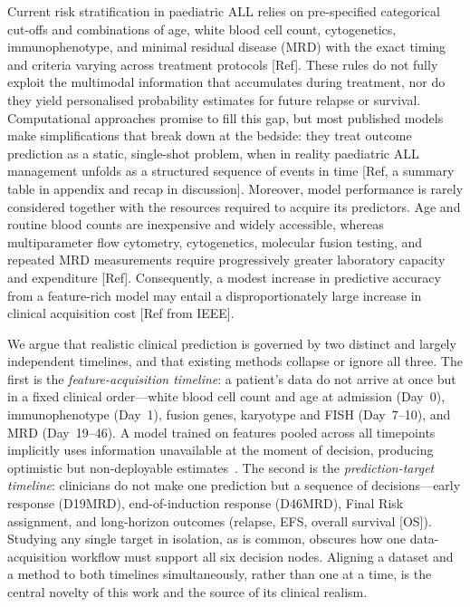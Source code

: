 \documentclass[pdflatex,sn-nature]{sn-jnl}
\begin{document}
Current risk stratification in paediatric ALL relies
on pre-specified categorical cut-offs and combinations of age, white blood cell count,
cytogenetics, immunophenotype, and minimal residual disease (MRD) with the exact timing and criteria varying across treatment
protocols [Ref].
These rules do not fully exploit the multimodal information that
accumulates during treatment, nor do they yield personalised
probability estimates for future relapse or survival.
Computational approaches promise to fill this gap, but most published
models make simplifications that break down at the bedside: they treat
outcome prediction as a static, single-shot problem, when in reality
paediatric ALL management unfolds as a structured sequence of events in
time [Ref, a summary table in appendix and recap in discussion]. Moreover, model performance is rarely considered together with
the resources required to acquire its predictors. Age and routine
blood counts are inexpensive and widely accessible, whereas
multiparameter flow cytometry, cytogenetics, molecular fusion testing,
and repeated MRD measurements require progressively greater laboratory
capacity and expenditure [Ref].
Consequently, a modest increase in predictive accuracy from a
feature-rich model may entail a disproportionately large increase in
clinical acquisition cost [Ref from IEEE].

We argue that realistic clinical prediction is governed by two
distinct and largely independent timelines, and that existing methods
collapse or ignore all three.
The first is the \emph{feature-acquisition timeline}: a patient's data
do not arrive at once but in a fixed clinical order—white blood cell
count and age at admission (Day~0), immunophenotype (Day~1),
fusion genes, karyotype and FISH (Day~7--10), and
MRD (Day~19--46).
A model trained on features pooled across all timepoints implicitly
uses information unavailable at the moment of decision, producing
optimistic but non-deployable estimates~\cite{[CITE:Steyerberg2019]}.
The second is the \emph{prediction-target timeline}: clinicians do not
make one prediction but a sequence of decisions—early response
(D19MRD), end-of-induction response (D46MRD), Final Risk assignment,
and long-horizon outcomes (relapse, EFS, overall survival [OS]).
Studying any single target in isolation, as is common, obscures how one
data-acquisition workflow must support all six decision nodes.
Aligning a dataset and a method to both timelines simultaneously,
rather than one at a time, is the central novelty of this work and the
source of its clinical realism.
\end{document}
